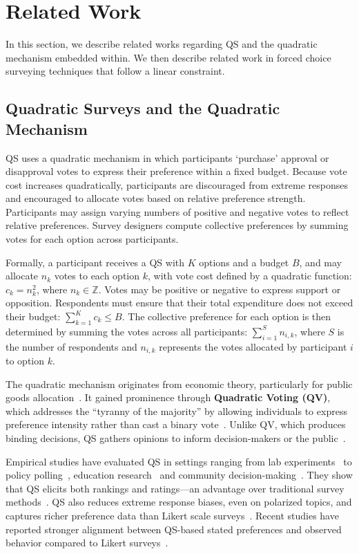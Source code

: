 \section{Related Work}
\label{sec:relatedWorks}
In this section, we describe related works regarding QS and the quadratic mechanism embedded within. We then describe related work in forced choice surveying techniques that follow a linear constraint.

\subsection{Quadratic Surveys and the Quadratic Mechanism}
QS uses a quadratic mechanism in which participants `purchase' approval or disapproval votes to express their preference within a fixed budget. Because vote cost increases quadratically, participants are discouraged from extreme responses and encouraged to allocate votes based on relative preference strength. Participants may assign varying numbers of positive and negative votes to reflect relative preferences. Survey designers compute collective preferences by summing votes for each option across participants.

Formally, a participant receives a QS with $K$ options and a budget $B$, and may allocate $n_k$ votes to each option $k$, with vote cost defined by a quadratic function: $c_k = n_k^2$, where $n_k \in \mathbb{Z}$. Votes may be positive or negative to express support or opposition. Respondents must ensure that their total expenditure does not exceed their budget: $\sum_{k=1}^{K} c_k \leq B$. The collective preference for each option is then determined by summing the votes across all participants: $\sum_{i=1}^{S} n_{i,k}$, where $S$ is the number of respondents and $n_{i,k}$ represents the votes allocated by participant $i$ to option $k$.

The quadratic mechanism originates from economic theory, particularly for public goods allocation~\cite{grovesOptimalAllocationPublic1977}. It gained prominence through \textbf{Quadratic Voting (QV)}, which addresses the ``tyranny of the majority'' by allowing individuals to express preference intensity rather than cast a binary vote~\cite{posner2018radical}. Unlike QV, which produces binding decisions, QS gathers opinions to inform decision-makers or the public~\cite{cavaille2024cares, chengOrganizeThenVote2025}.

Empirical studies have evaluated QS in settings ranging from lab experiments~\cite{chengCanShowWhat2021, quarfoot2017quadratic} to policy polling~\cite{cavaille2024cares, hollandDistributiveImpactsSupport2022}, education research~\cite{naylor2017first} and community decision-making~\cite{karpinskiPotentialQuadraticVoting2025}. They show that QS elicits both rankings and ratings---an advantage over traditional survey methods~\cite{chengCanShowWhat2021}. QS also reduces  extreme response biases, even on polarized topics, and captures richer preference data than Likert scale surveys~\cite{quarfoot2017quadratic, cavaille2024cares, chengCanShowWhat2021, naylor2017first}. Recent studies have reported stronger alignment between QS-based stated preferences and observed behavior compared to Likert surveys~\cite{cavaille2024cares, chengCanShowWhat2021}.

